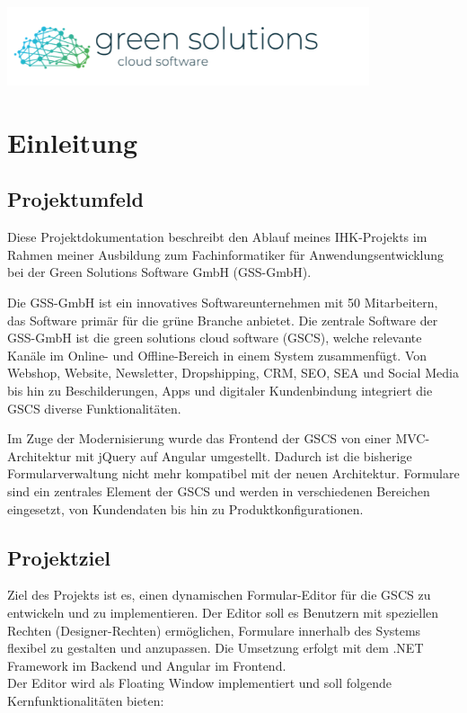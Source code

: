 \documentclass[a4paper,11pt]{article}
\begin{document}
\begin{titlepage}
\begin{center}
\includegraphics[width=0.8\textwidth]{green_solutions_logo}
\end{center}
\end{titlepage}


\tableofcontents
\newpage

\section{Einleitung}

\subsection{Projektumfeld}

Diese Projektdokumentation beschreibt den Ablauf meines IHK-Projekts im Rahmen meiner Ausbildung zum Fachinformatiker für Anwendungsentwicklung bei der Green Solutions Software GmbH (GSS-GmbH).

Die GSS-GmbH ist ein innovatives Softwareunternehmen mit 50 Mitarbeitern, das Software primär für die grüne Branche anbietet. Die zentrale Software der GSS-GmbH ist die green solutions cloud software (GSCS), welche relevante Kanäle im Online- und Offline-Bereich in einem System zusammenfügt. Von Webshop, Website, Newsletter, Dropshipping, CRM, SEO, SEA und Social Media bis hin zu Beschilderungen, Apps und digitaler Kundenbindung integriert die GSCS diverse Funktionalitäten.

Im Zuge der Modernisierung wurde das Frontend der GSCS von einer MVC-Architektur mit jQuery auf Angular umgestellt. Dadurch ist die bisherige Formularverwaltung nicht mehr kompatibel mit der neuen Architektur. Formulare sind ein zentrales Element der GSCS und werden in verschiedenen Bereichen eingesetzt, von Kundendaten bis hin zu Produktkonfigurationen.

\subsection{Projektziel}

Ziel des Projekts ist es, einen dynamischen Formular-Editor für die GSCS zu entwickeln und zu implementieren. Der Editor soll es Benutzern mit speziellen Rechten (Designer-Rechten) ermöglichen, Formulare innerhalb des Systems flexibel zu gestalten und anzupassen. Die Umsetzung erfolgt mit dem .NET Framework im Backend und Angular im Frontend.\\
Der Editor wird als Floating Window implementiert und soll folgende Kernfunktionalitäten bieten:
\end{document}
